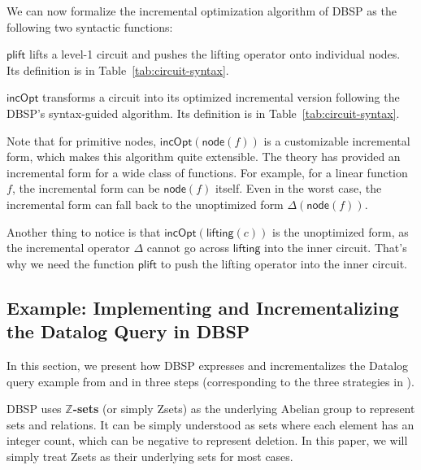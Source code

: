 We can now formalize the incremental optimization algorithm of DBSP as the following two syntactic functions:

\begin{definition}\label{def:plift}
    $\mathsf{plift}$ lifts a level-1 circuit and pushes the lifting operator onto individual nodes. Its definition is in Table~\ref{tab:circuit-syntax}.
\end{definition}
\begin{definition}\label{def:incOpt}
    $\mathsf{incOpt}$ transforms a circuit into its optimized incremental version following the DBSP's syntax-guided algorithm. Its definition is in Table~\ref{tab:circuit-syntax}.
\end{definition}

Note that for primitive nodes, $\mathsf{incOpt}(\mathsf{node}(f))$ is a customizable incremental form, which makes this algorithm quite extensible. The theory has provided an incremental form for a wide class of functions. For example, for a linear function $f$, the incremental form can be $\mathsf{node}(f)$ itself. Even in the worst case, the incremental form can fall back to the unoptimized form $\Delta(\mathsf{node}(f))$.

Another thing to notice is that $\mathsf{incOpt}(\mathsf{lifting}(c))$ is the unoptimized form, as the incremental operator $\Delta$ cannot go across $\mathsf{lifting}$ into the inner circuit. That's why we need the function $\mathsf{plift}$ to push the lifting operator into the inner circuit.

\subsection{Example: Implementing and Incrementalizing the Datalog Query in DBSP}\label{sec:pre-example}

In this section, we present how DBSP expresses and incrementalizes the Datalog query example from  and  in three steps (corresponding to the three strategies in ).

DBSP uses \textbf{$\mathbb{Z}$-sets} \cite{Green2009ReconcilableD} (or simply Zsets) as the underlying Abelian group to represent sets and relations. It can be simply understood as sets where each element has an integer count, which can be negative to represent deletion. In this paper, we will simply treat Zsets as their underlying sets for most cases.

